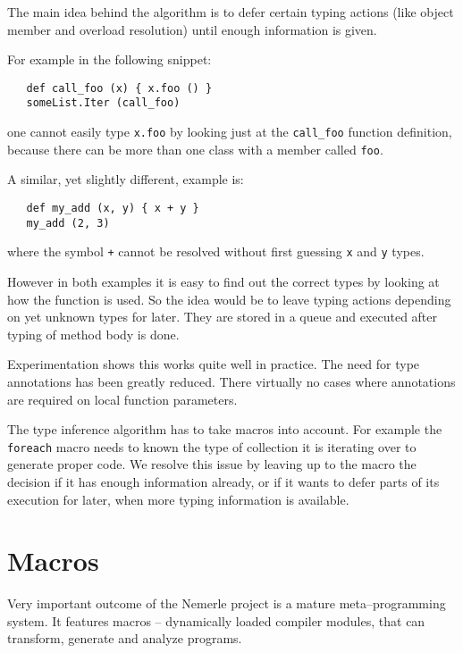 \documentclass{article}
\begin{document}
The main idea behind the algorithm is to defer certain typing actions
(like object member and overload resolution) until enough information
is given.

For example in the following snippet:
\begin{verbatim}
   def call_foo (x) { x.foo () }
   someList.Iter (call_foo)
\end{verbatim}
one cannot easily type \texttt{x.foo} by looking just at the
\texttt{call\_foo} function definition, because there can be
more than one class with a member called \texttt{foo}.

A similar, yet slightly different, example is:
\begin{verbatim}
   def my_add (x, y) { x + y }
   my_add (2, 3)
\end{verbatim}
where the symbol \texttt{+} cannot be resolved without
first guessing \texttt{x} and \texttt{y} types.

However in both examples it is easy to find out the correct
types by looking at how the function is used. So the idea would be
to leave typing actions depending on yet unknown types for later.
They are stored in a queue and executed after typing of method body
is done.

Experimentation shows this works quite well in practice. The need for
type annotations has been greatly reduced. There virtually no cases
where annotations are required on local function parameters.

The type inference algorithm has to take macros into account. For
example the \texttt{foreach} macro needs to known the type of collection
it is iterating over to generate proper code. We resolve this issue
by leaving up to the macro the decision if it has enough information already,
or if it wants to defer parts of its execution for later, when
more typing information is available.

\section{Macros}

Very important outcome of the Nemerle project is a mature meta--programming
system. It features macros -- dynamically loaded compiler modules,
that can transform, generate and analyze programs.
\end{document}
